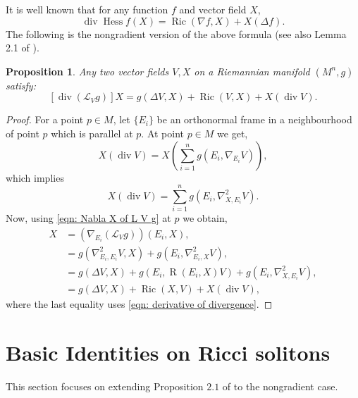 \documentclass{amsart}
\newcommand{\lie}[1]{\mathcal{L}_{#1}}
\DeclareMathOperator*{\ricci}{Ric}
\DeclareMathOperator*{\divergence}{div}
\DeclareMathOperator*{\curvature}{R}
\DeclareMathOperator*{\hessian}{Hess}
\theoremstyle{plain}
\newtheorem{proposition}{Proposition}
\theoremstyle{plain}
\theoremstyle{plain}
\theoremstyle{plain}
\theoremstyle{remark}
\begin{document}
It is well known that for any function $f$ and vector field $X$, 
$$\divergence \hessian f (X) = \ricci (\nabla f, X) + X(\Delta f). $$
The following is the nongradient version of the above formula (see also Lemma 2.1 of \cite{MR2507581}).

\begin{proposition}\label{prop: Divergence of L V g}
 Any two vector fields $V, X$ on a Riemannian manifold $(M^n,g)$  
satisfy:
\begin{equation}\label{eqn: Divergence of Lie derivative}
        [ \divergence ( \lie{V}g ) ] X = g (\Delta V , X) + \ricci(V,X) + X (\divergence V).
    \end{equation}
\end{proposition}
\begin{proof}
For a point $p\in M$, let $\{E_i\}$ be an orthonormal frame in a neighbourhood of 
point $p$ which is parallel at $p$.  At point $p \in M$ we get,
    \begin{equation*}
        X( \divergence V ) = X \left( \sum_{i=1}^n g(E_i, \nabla_{E_i} V) \right),
    \end{equation*}
    which implies
    \begin{equation}\label{eqn: derivative of divergence}
        X( \divergence V ) = \sum_{i=1}^n g( E_i, \nabla^2_{X,E_i} V ).
    \end{equation}
    Now, using \cref{eqn: Nabla X of L V g} at $p$ we obtain,
    \begin{align*}
        [ \divergence ( \lie{V}g ) ] X &= \left(\nabla_{E_i} ( \lie{V}g ) \right) (E_i, X), \\
            &= g( \nabla^2_{E_i,E_i} V , X ) + g( E_i, \nabla^2_{E_i,X} V ), \\
            &= g(\Delta V, X) + g( E_i, \curvature(E_i, X)V ) + g(E_i, \nabla^2_{X,E_i}V), \\
            &= g(\Delta V, X) + \ricci(X,V) + X(\divergence V),
    \end{align*}
    where the last equality uses \cref{eqn: derivative of divergence}.
\end{proof}

\vspace{0.1in}











\section{Basic Identities on Ricci solitons}\label{der}
This section focuses on extending Proposition $2.1$ of \cite{MR2448435} to the nongradient case. 
\end{document}

